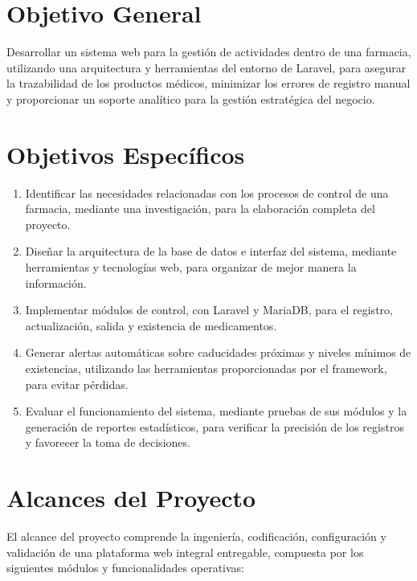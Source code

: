 \section{Objetivo General}
Desarrollar un sistema web para la gestión de actividades dentro de una farmacia, utilizando una arquitectura y herramientas del entorno de Laravel, para asegurar la trazabilidad de los productos médicos, minimizar los errores de registro manual y proporcionar un soporte analítico para la gestión estratégica del negocio.

\section{Objetivos Específicos}
\begin{enumerate}
    \item Identificar las necesidades relacionadas con los procesos de control de una farmacia, mediante una investigación, para la elaboración completa del proyecto.
    \item Diseñar la arquitectura de la base de datos e interfaz del sistema, mediante herramientas y tecnologías web, para organizar de mejor manera la información.
    \item Implementar módulos de control, con Laravel y MariaDB, para el registro, actualización, salida y existencia de medicamentos.
    \item Generar alertas automáticas sobre caducidades próximas y niveles mínimos de existencias, utilizando las herramientas proporcionadas por el framework, para evitar pérdidas.
    \item Evaluar el funcionamiento del sistema, mediante pruebas de sus módulos y la generación de reportes estadísticos, para verificar la precisión de los registros y favorecer la toma de decisiones.
\end{enumerate}

\section{Alcances del Proyecto}

El alcance del proyecto comprende la ingeniería, codificación, configuración y validación de una plataforma web integral entregable, compuesta por los siguientes módulos y funcionalidades operativas:

